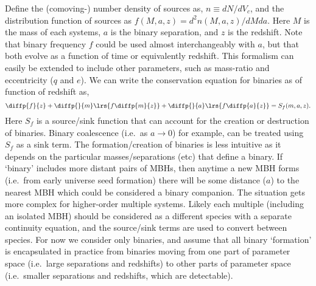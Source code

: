 \documentclass[10pt, oneside, onecolumn]{article}   	%
\begin{document}
    Define the (comoving-) number density of sources as, $n \equiv dN / dV_c$, and the distribution function of sources as $f(M,a,z) = d^2 n(M,a,z) / dM da$.  Here $M$ is the mass of each systems, $a$ is the binary separation, and $z$ is the redshift.  Note that binary frequency $f$ could be used almost interchangeably with $a$, but that both evolve as a function of time or equivalently redshift.  This formalism can easily be extended to include other parameters, such as mass-ratio and eccentricity ($q$ and $e$).  We can write the conservation equation for binaries as of function of redshift as,
    \begin{equation}
    \label{eq:conservation}
    \diffp{f}{z} + \diffp{}{m} \lrs{f \diffp{m}{z}} + \diffp{}{a} \lrs{f \diffp{a}{z}} = S_f(m, a, z).
    \end{equation}
    Here $S_f$ is a source/sink function that can account for the creation or destruction of binaries.  Binary coalescence (i.e.~as $a\rightarrow 0$) for example, can be treated using $S_f$ as a sink term.  The formation/creation of binaries is less intuitive as it depends on the particular masses/separations (etc) that define a binary.  If `binary' includes more distant pairs of MBHs, then anytime a new MBH forms (i.e.~from early universe seed formation) there will be some distance ($a$) to the nearest MBH which could be considered a binary companion.  The situation gets more complex for higher-order multiple systems.  Likely each multiple (including an isolated MBH) should be considered as a different species with a separate continuity equation, and the source/sink terms are used to convert between species.  For now we consider only binaries, and assume that all binary `formation' is encapsulated in practice from binaries moving from one part of parameter space (i.e.~large separations and redshifts) to other parts of parameter space (i.e.~smaller separations and redshifts, which are detectable).
\end{document}
